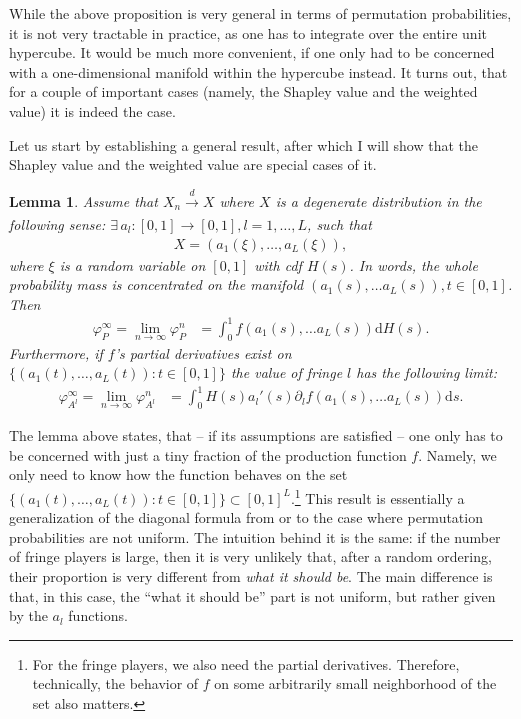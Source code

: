 \documentclass[a4paper]{article}
\newtheorem{lemma}{Lemma}
\newcommand{\ds}{\mathrm{d}s}
\begin{document}
While the above proposition is very general in terms of permutation probabilities, it is not very tractable in practice, as one has to integrate over the entire unit hypercube.
It would be much more convenient, if one only had to be concerned with a one-dimensional manifold within the hypercube instead.
It turns out, that for a couple of important cases (namely, the Shapley value and the weighted value) it is indeed the case.

Let us start by establishing a general result, after which I will show that the Shapley value and the weighted value are special cases of it.

\begin{lemma}
    \label{lem:many_sided_manifold}
    Assume that $X_n \xrightarrow[]{d} X$ where $X$ is a degenerate distribution in the following sense: $\exists \, a_l: [0, 1] \to [0, 1], l = 1, \dots, L$, such that
    \begin{align*}
        X = (a_1(\xi), \dots, a_L(\xi)),
    \end{align*}
    where $\xi$ is a random variable on $[0, 1]$ with cdf $H(s)$.
    In words, the whole probability mass is concentrated on the manifold $(a_1(s), \dots a_L(s)), t \in [0, 1]$.
    Then
    \begin{align*}
        \varphi_P^\infty = \lim_{n \to \infty} \varphi_P^n &= \int_0^1 f(a_1(s), \dots a_L(s)) \mathrm{d}H(s).
    \end{align*}
    Furthermore, if $f$'s partial derivatives exist on $\{(a_1(t), \dots, a_L(t)) : t \in [0, 1]\}$ the value of fringe $l$ has the following limit:
    \begin{align*}
        \varphi_{A^l}^\infty = \lim_{n \to \infty} \varphi_{A^l}^n &= \int_0^1 H(s) a_l'(s) \partial_l f(a_1(s), \dots a_L(s)) \ds.        
    \end{align*}
\end{lemma}

The lemma above states, that -- if its assumptions are satisfied -- one only has to be concerned with just a tiny fraction of the production function $f$.
Namely, we only need to know how the function behaves on the set $\{(a_1(t), \dots, a_L(t)) : t \in [0, 1]\} \subset [0, 1]^L$.\footnote{
    For the fringe players, we also need the partial derivatives.
    Therefore, technically, the behavior of $f$ on some arbitrarily small neighborhood of the set also matters.
}
This result is essentially a generalization of the diagonal formula from \textcite{aumann2015values} or \textcite{stole1996intra} to the case where permutation probabilities are not uniform.
The intuition behind it is the same: if the number of fringe players is large, then it is very unlikely that, after a random ordering, their proportion is very different from \emph{what it should be}.
The main difference is that, in this case, the ``what it should be'' part is not uniform, but rather given by the $a_l$ functions.
\end{document}

